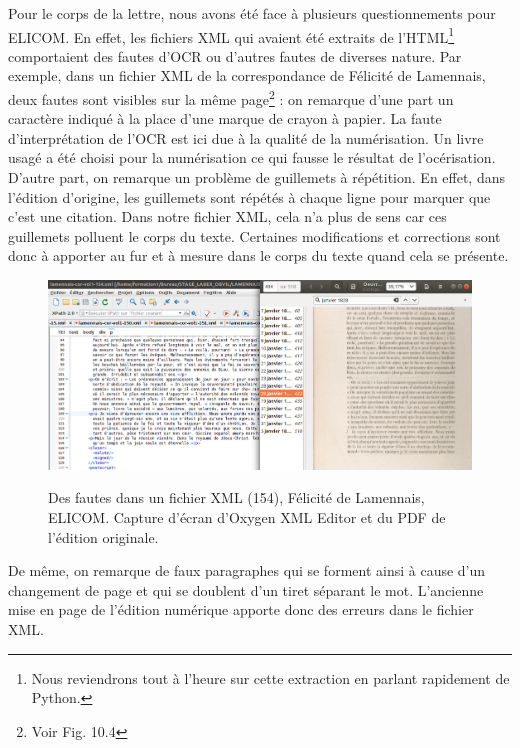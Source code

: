 Pour le corps de la lettre, nous avons été face à plusieurs questionnements pour ELICOM. En effet, les fichiers XML qui avaient été extraits de l'HTML\footnote{Nous reviendrons tout à l'heure sur cette extraction en parlant rapidement de Python.} comportaient des fautes d'OCR ou d'autres fautes de diverses nature. Par exemple, dans un fichier XML de la correspondance de Félicité de Lamennais, deux fautes sont visibles sur la même page\footnote{Voir Fig. 10.4} : on remarque d'une part un caractère  indiqué à la place d'une marque de crayon à papier. La faute d'interprétation de l'OCR est ici due à la qualité de la numérisation. Un livre usagé a été choisi pour la numérisation ce qui fausse le résultat de l'océrisation. D'autre part, on remarque un problème de guillemets à répétition. En effet, dans l'édition d'origine, les guillemets sont répétés à chaque ligne pour marquer que c'est une citation. Dans notre fichier XML, cela n'a plus de sens car ces guillemets polluent le corps du texte. Certaines modifications et corrections sont donc à apporter au fur et à mesure dans le corps du texte quand cela se présente.

\begin{figure}[ht]
    \centering
    \caption{Des fautes dans un fichier XML (154), Félicité de Lamennais, ELICOM. Capture d'écran d'Oxygen XML Editor et du PDF de l'édition originale.}
    \includegraphics[width=15cm]{images/crayonPapier.png}
    \label{crayonPapier}
\end{figure}

De même, on remarque de faux paragraphes qui se forment ainsi à cause d'un changement de page et qui se doublent d'un tiret séparant le mot. L'ancienne mise en page de l'édition numérique apporte donc des erreurs dans le fichier XML. 

